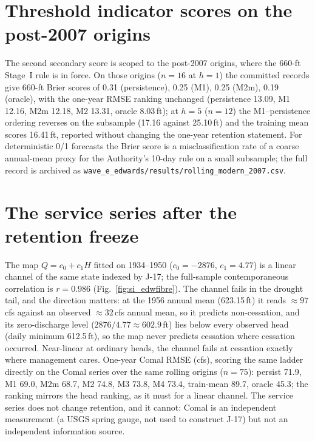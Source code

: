 \documentclass[preprint,11pt,authoryear]{elsarticle}
\theoremstyle{remark}
\begin{document}
\section{Threshold indicator scores on the post-2007 origins}\label{si:edwbrier}

The second secondary score is scoped to the post-2007 origins, where the 660-ft Stage~I rule is in force. On those origins ($n=16$ at $h=1$) the committed records give 660-ft Brier scores of 0.31 (persistence), 0.25 (M1), 0.25 (M2m), 0.19 (oracle), with the one-year RMSE ranking unchanged (persistence 13.09, M1 12.16, M2m 12.18, M2 13.31, oracle 8.03\,ft); at $h=5$ ($n=12$) the M1--persistence ordering reverses on the subsample (17.16 against 25.10\,ft) and the training mean scores 16.41\,ft, reported without changing the one-year retention statement. For deterministic 0/1 forecasts the Brier score is a misclassification rate of a coarse annual-mean proxy for the Authority's 10-day rule on a small subsample; the full record is archived as \texttt{wave\_e\_edwards/results/rolling\_modern\_2007.csv}.

\FloatBarrier
\section{The service series after the retention freeze}\label{si:edwcomal}

The map $Q=c_0+c_1H$ fitted on 1934--1950 ($c_0=-2876$, $c_1=4.77$) is a linear channel of the same state indexed by J-17; the full-sample contemporaneous correlation is $r=0.986$ (Fig.~\ref{fig:si_edwfibre}). The channel fails in the drought tail, and the direction matters: at the 1956 annual mean (623.15\,ft) it reads $\approx97$\,cfs against an observed $\approx32$\,cfs annual mean, so it predicts non-cessation, and its zero-discharge level ($2876/4.77\approx602.9$\,ft) lies below every observed head (daily minimum 612.5\,ft), so the map never predicts cessation where cessation occurred. Near-linear at ordinary heads, the channel fails at cessation exactly where management cares. One-year Comal RMSE (cfs), scoring the same ladder directly on the Comal series over the same rolling origins ($n=75$): persist 71.9, M1 69.0, M2m 68.7, M2 74.8, M3 73.8, M4 73.4, train-mean 89.7, oracle 45.3; the ranking mirrors the head ranking, as it must for a linear channel. The service series does not change retention, and it cannot: Comal is an independent measurement (a USGS spring gauge, not used to construct J-17) but not an independent information source.
\end{document}
